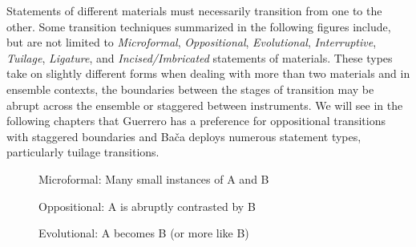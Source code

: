 Statements of different materials must necessarily transition from one to the other. Some transition techniques summarized in the following figures include, but are not limited to \textit{Microformal}, \textit{Oppositional}, \textit{Evolutional}, \textit{Interruptive}, \textit{Tuilage}, \textit{Ligature}, and \textit{Incised/Imbricated} statements of materials. These types take on slightly different forms when dealing with more than two materials and in ensemble contexts, the boundaries between the stages of transition may be abrupt across the ensemble or staggered between instruments. We will see in the following chapters that Guerrero has a preference for oppositional transitions with staggered boundaries and Bača deploys numerous statement types, particularly tuilage transitions.

\begin{figure}[H]
    \centering
{}
    \caption{Microformal: Many small instances of A and B}
    \label{fig:microformal}
\end{figure}

\begin{figure}[H]
    \centering
{}
    \caption{Oppositional: A is abruptly contrasted by B}
    \label{fig:contrast}
\end{figure}

\begin{figure}[H]
    \centering
{}
    \caption{Evolutional: A becomes B (or more like B)}
    \label{fig:evolution}
\end{figure}

